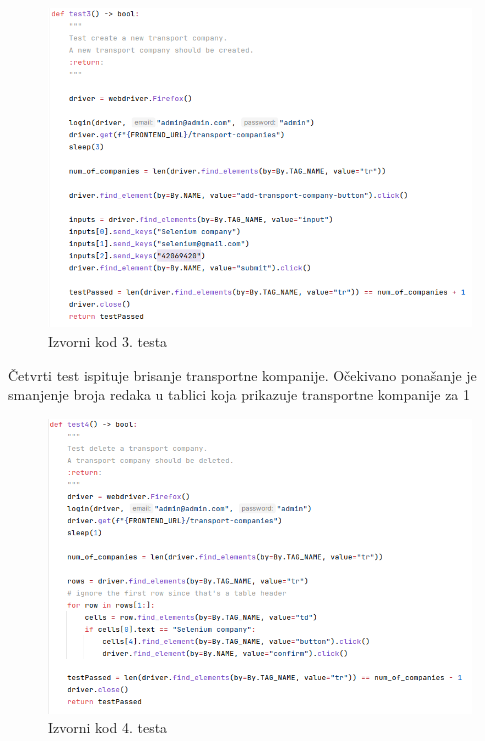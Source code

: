 			\begin{figure}[H]
				\includegraphics[width=\textwidth]{slike/selenium_test3.png}
				\centering
				\caption{Izvorni kod 3. testa}
				\label{fig:izvorni-kod-testa-3}
			\end{figure}
		
			Četvrti test ispituje brisanje transportne kompanije. Očekivano ponašanje je smanjenje broja redaka u tablici koja prikazuje transportne kompanije za 1
		
			\begin{figure}[H]
				\includegraphics[width=\textwidth]{slike/selenium_test4.png}
				\centering
				\caption{Izvorni kod 4. testa}
				\label{fig:izvorni-kod-testa-4}
			\end{figure}
		
